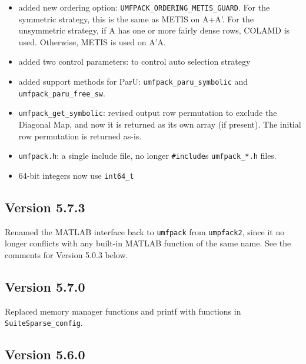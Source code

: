 \documentclass[11pt]{article}
\begin{document}
\begin{itemize}
    \item added new ordering option: \verb'UMFPACK_ORDERING_METIS_GUARD'.  For the
        symmetric strategy, this is the same as METIS on A+A'.  For the
        unsymmetric strategy, if A has one or more fairly dense rows,
        COLAMD is used.  Otherwise, METIS is used on A'A.
    \item added two control parameters: to control auto selection strategy
    \item added support methods for ParU: \verb'umfpack_paru_symbolic' and
        \verb'umfpack_paru_free_sw'.
    \item \verb'umfpack_get_symbolic': revised output row permutation to exclude
        the Diagonal Map, and now it is returned as its own array (if present).
        The initial row permutation is returned as-is.
    \item \verb'umfpack.h': a single include file, no longer \verb'#include's \verb'umfpack_*.h' files.
    \item 64-bit integers now use \verb'int64_t'
\end{itemize}

\subsection{Version 5.7.3}

Renamed the MATLAB interface back to {\tt umfpack} from {\tt umpfack2}, since
it no longer conflicts with any built-in MATLAB function of the same name. 
See the comments for Version 5.0.3 below.

\subsection{Version 5.7.0}

Replaced memory manager functions and printf with functions
in {\tt SuiteSparse\_config}.

\subsection{Version 5.6.0}
\end{document}
